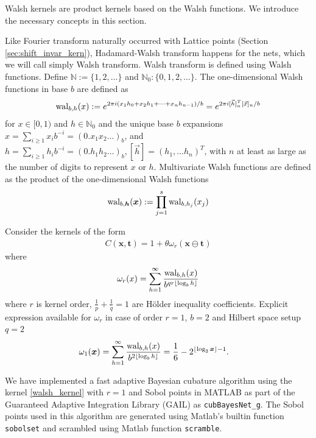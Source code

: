 \documentclass{iitthesis}          %
\newcommand{\bm}[1]{\boldsymbol{#1}}
\newcommand{\naturals}{\mathbb{N}}
\newcommand{\vh}{\bm{h}}
\newcommand{\vt}{\bm{t}}
\newcommand{\vx}{\bm{x}}
\newcommand{\code}[1]{\texttt{#1}}
\begin{document}
Walsh kernels are product kernels based on the Walsh functions. We introduce the necessary concepts in this section.

Like Fourier transform naturally occurred with Lattice points (Section \ref{sec:shift_invar_kern}), Hadamard-Walsh transform happens for the nets, which we will call simply Walsh transform. Walsh transform  is defined using Walsh functions. Define $\naturals:=\lbrace1,2,\dots \rbrace$ and $\naturals_0 : \lbrace0,1,2,\dots \rbrace$.
The one-dimensional Walsh functions in base $b$ are defined as
\begin{align*}
\textup{wal}_{b,h}(x) := e^{2\pi i (x_1 h_0 + x_2 h_1 + \dots + x_n h_{n-1})/b} 
=
e^{2\pi i [\vec{h}]_n^T[\vec {x}]_n/b}
\end{align*}
for $x \in [0,1)$ and $h \in \naturals_0$ and the unique base $b$ expansions 
$x = \sum_{i \ge 1} x_i b^{-i} = (0.x_1 x_2 \dots)_b$,
and
$h = \sum_{i \ge 1} h_i b^{-i} = (0.h_1 h_2 \dots)_b, [\vec{h}] =  (h_1,\dots h_n)^T$,
with $n$ at least as large as the number of digits to represent $x$ or $h$.
Multivariate Walsh functions are defined as the product of the one-dimensional Walsh functions
\begin{align*}
\textup{wal}_{b,\vh} (\vx) := \prod_{j=1}^s \textup{wal}_{b,h_j} (x_j
)
\end{align*}


Consider the kernels of the form \cite{Nuyens2013}
\begin{align}
\label{walsh_kernel}
C(\vx, \vt) = 1 + \theta \omega_{r} (\vx \ominus \vt)
\end{align}
where 
\begin{align*}
\omega_r(x) = \sum_{h=1}^\infty 
\frac{\textup{wal}_{b,h}(x) }{b^{qr \lfloor \log_b h \rfloor}}
\end{align*}
where $r$ is kernel order, $\frac 1p + \frac 1q = 1$ are H\"older inequality coefficients. Explicit expression available for $\omega_{r}$ \cite{Nuyens2013} in case of order $r=1$, $b=2$ and Hilbert space setup $q=2$
\begin{align}
\omega_1(\vx) &= \sum_{h=1}^\infty 
\frac{\textup{wal}_{b,h}(x) }{b^{2 \lfloor \log_b h \rfloor}} = \frac 16 - 2^{\lfloor \log_2 \vx\rfloor -1 }.
\end{align}

We have implemented a fast adaptive Bayesian cubature algorithm using the kernel \eqref{walsh_kernel} with $r=1$ and Sobol points in MATLAB as part of the Guaranteed Adaptive Integration Library (GAIL) \cite{ChoEtal17b} as \allowbreak \code{cubBayesNet\_g}. The Sobol points used in this algorithm are generated using Matlab's builtin function \code{sobolset} and scrambled using Matlab function \code{scramble}.
\end{document}
